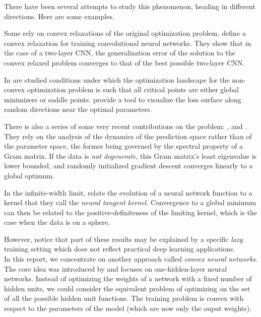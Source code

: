 \documentclass[a4paper, 11pt]{scrartcl}
\begin{document}
{There have been several attempts to study this phenomenon, heading in different directions. Here are some examples.

Some rely on convex relaxations of the original optimization problem. \cite{zhang2016convexified} define a convex relaxation for training convolutional neural networks. They show that in the case of a two-layer CNN, the generalization error of the solution to the convex relaxed problem converges to that of the best possible two-layer CNN.

In \cite{haeffele2017global} are studied conditions under which the optimization landscape for the non-convex optimization problem is such that all critical points are either global minimizers or saddle points. \cite{visualloss} provide a tool to visualize the loss surface along random directions near the optimal parameters.

There is also a series of some very recent contributions on the problem: \cite{du2018agradient}, \cite{du2018bgradient} and \cite{zou2018stochastic}. They rely on the analysis of the dynamics of the prediction space rather than of the parameter space, the former being governed by the spectral property of a Gram matrix. If the data is \textit{not degenerate}, this Gram matrix’s least eigenvalue is lower bounded, and randomly initialized gradient descent converges linearly to a global optimum.

In the infinite-width limit, \cite{jacot2018neural} relate the evolution of a neural network function to a kernel that they call the \textit{neural tangent kernel}. Convergence to a global minimum can then be related to the positive-definiteness of the limiting kernel, which is the case when the data is on a sphere.

However, \cite{chizat:hal-01945578} notice that part of these results may be explained by a specific \textit{lazy} training setting which does not reflect practical deep learning applications. \\

In this report, we concentrate on another approach called \textit{convex neural networks}. The core idea was introduced by \cite{bengio2006convex} and focuses on one-hidden-layer neural networks. Instead of optimizing the weights of a network with a fixed number of hidden units, we could consider the equivalent problem of optimizing on the set of all the possible hidden unit functions. The training problem is convex with respect to the parameters of the model (which are now only the ouput weights).

}
\end{document}
